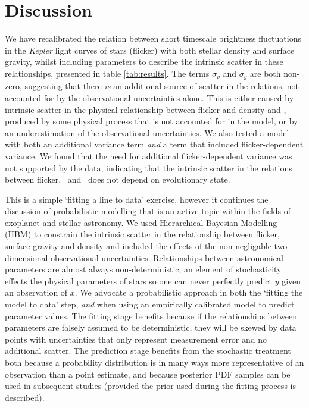 \section{Discussion}
\label{sec:discussion}

We have recalibrated the relation between short timescale brightness
fluctuations in the {\it Kepler} light curves of stars (flicker) with both
stellar density and surface gravity, whilst including parameters to describe
the intrinsic scatter in these relationships, presented in table
\ref{tab:results}.
The terms $\sigma_\rho$ and $ \sigma_g$ are both non-zero, suggesting that
there {\it is} an additional source of scatter in the relations, not accounted
for by the observational uncertainties alone.
This is either caused by intrinsic scatter in the physical relationship
between flicker and density and \logg, produced by some physical process that
is not accounted for in the model, or by an underestimation of the
observational uncertainties.
We also tested a model with both an additional variance term {\it and} a term
that included flicker-dependent variance.
We found that the need for additional flicker-dependent variance was not
supported by the data, indicating that the intrinsic scatter in the relations
between flicker, \logg\ and \rhostar\ does not depend on evolutionary state.

This is a simple `fitting a line to data' exercise, however it continues the
discussion of probabilistic modelling that is an active topic within the
fields of exoplanet and stellar astronomy.
We used Hierarchical Bayesian Modelling (HBM) to constrain the intrinsic
scatter in the relationship between flicker, surface gravity and density and
included the effects of the non-negligable two-dimensional observational
uncertainties.
Relationships between astronomical parameters are almost always
non-deterministic; an element of stochasticity effects the physical parameters
of stars so one can never perfectly predict $y$ given an observation of $x$.
We advocate a probabilistic approach in both the `fitting the model to data'
step, {\it and} when using an empirically calibrated model to predict
parameter values.
The fitting stage benefits because if the relationships between parameters are
falsely assumed to be deterministic, they will be skewed by data points with
uncertainties that only represent measurement error and no additional scatter.
The prediction stage benefits from the stochastic treatment both because a
probability distribution is in many ways more representative of an observation
than a point estimate, and because posterior PDF samples can be used in
subsequent studies (provided the prior used during the fitting process is
described).

